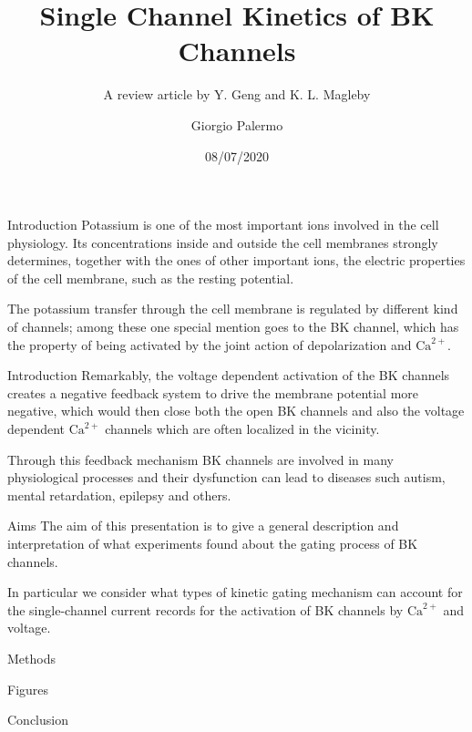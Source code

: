 \documentclass{beamer}
\title{Single Channel Kinetics of BK Channels}
\subtitle{A review article by Y. Geng and K. L. Magleby}
\author{Giorgio Palermo}
\date{08/07/2020}
\institute{LM Physics - a.a. 2019/20 - Biological Physics }
\newcommand{\ca}{\text{Ca}^{2+}}
\begin{document}
\begin{frame}{}
  \titlepage
\end{frame}

\begin{frame}{Introduction}
Potassium is one of the most important ions involved in the cell physiology.
Its concentrations inside and outside the cell membranes strongly determines, together with the ones of other important ions, the electric properties of the cell membrane, such as the resting potential.

The potassium transfer through the cell membrane is regulated by different kind of channels; among these one special mention goes to the BK channel, which has the property of being activated by the joint action of depolarization and $\text{Ca}^{2+}.$

\end{frame}

\begin{frame}{Introduction}
Remarkably, the voltage dependent activation of the BK channels creates a negative feedback system to drive the membrane potential more negative, which would then close both the open BK channels and also the voltage dependent $\ca$ channels which are often localized in the vicinity.

Through this feedback mechanism BK channels are involved in many physiological processes and their dysfunction can lead to diseases such autism, mental retardation, epilepsy and others.
\end{frame}

\begin{frame}{Aims}
The aim of this presentation is to give a general description and interpretation of what experiments found about the gating process of BK channels.

In particular we consider what types of kinetic gating mechanism can account for the single-channel current records for the activation of BK channels by $\ca$ and voltage.

\end{frame}

\begin{frame}

\end{frame}

\begin{frame}{Methods}

\end{frame}

\begin{frame}{Figures}

\end{frame}

\begin{frame}{Conclusion}

\end{frame}
\end{document}
